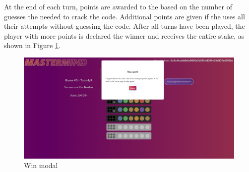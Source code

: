 At the end of each turn, points are awarded to the  based on the number of guesses the  needed to crack the code. 
Additional points are given if the  uses all their attempts without guessing the code. 
After all turns have been played, the player with more points is declared the winner and receives the entire stake, as shown in Figure \ref{fig:win_interface}.

\begin{figure}[htbp]
   \centering
   \includegraphics{images/win.PNG}
   \caption{Win modal}
   \label{fig:win_interface}
\end{figure}

